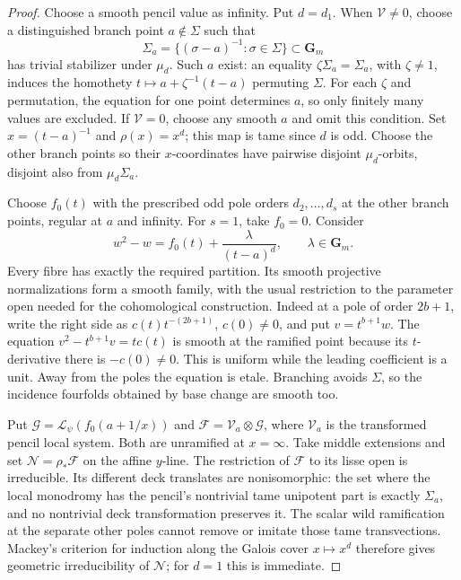 \documentclass[11pt]{article}
\theoremstyle{remark}\newtheorem{remark}[theorem]{Remark}
\begin{document}
\begin{proof}
Choose a smooth pencil value as infinity. Put \(d=d_1\).
When \(\mathcal V\ne0\), choose a distinguished branch point
\(a\notin\Sigma\) such that
\[
 \Sigma_a=\{(\sigma-a)^{-1}:\sigma\in\Sigma\}\subset\mathbf G_m
\]
has trivial stabilizer under \(\mu_d\). Such \(a\) exist: an equality
\(\zeta\Sigma_a=\Sigma_a\), with \(\zeta\ne1\), induces the homothety
\(t\mapsto a+\zeta^{-1}(t-a)\) permuting \(\Sigma\).
For each \(\zeta\) and permutation, the equation for one point
determines \(a\), so only finitely many values are excluded.
If \(\mathcal V=0\), choose any smooth \(a\) and omit this condition.
Set \(x=(t-a)^{-1}\) and \(\rho(x)=x^d\); this map is tame since \(d\)
is odd. Choose the other branch points so their \(x\)-coordinates
have pairwise disjoint \(\mu_d\)-orbits, disjoint also from
\(\mu_d\Sigma_a\).

Choose \(f_0(t)\) with the prescribed odd pole orders
\(d_2,\ldots,d_s\) at the other branch points, regular at \(a\)
and infinity. For \(s=1\), take \(f_0=0\). Consider
\[
       w^2-w=f_0(t)+\frac{\lambda}{(t-a)^d},
       \qquad \lambda\in\mathbf G_m.                    \tag{C05.1}
\]
Every fibre has exactly the required partition. Its smooth projective
normalizations form a smooth family, with the usual restriction to
the parameter open needed for the cohomological construction.
Indeed at a pole of order \(2b+1\), write the right side as
\(c(t)t^{-(2b+1)}\), \(c(0)\ne0\), and put \(v=t^{b+1}w\).
The equation
\(v^2-t^{b+1}v=t c(t)\) is smooth at the ramified point because its
\(t\)-derivative there is \(-c(0)\ne0\). This is uniform while
the leading coefficient is a unit. Away from the poles the equation
is etale. Branching avoids \(\Sigma\), so the incidence fourfolds
obtained by base change are smooth too.

Put \(\mathcal G=\mathcal L_\psi(f_0(a+1/x))\) and
\(\mathcal F=\mathcal V_a\otimes\mathcal G\), where
\(\mathcal V_a\) is the transformed pencil local system.
Both are unramified at \(x=\infty\).
Take middle extensions and set
\(\mathcal N=\rho_*\mathcal F\) on the affine \(y\)-line.
The restriction of \(\mathcal F\) to its lisse open is irreducible.
Its different deck translates are nonisomorphic: the set where the
local monodromy has the pencil's nontrivial tame unipotent part is
exactly \(\Sigma_a\), and no nontrivial deck transformation preserves
it. The scalar wild ramification at the separate other poles cannot
remove or imitate those tame transvections.
Mackey's criterion for induction along the Galois cover
\(x\mapsto x^d\) therefore gives geometric irreducibility of
\(\mathcal N\); for \(d=1\) this is immediate.


\end{proof}
\end{document}
